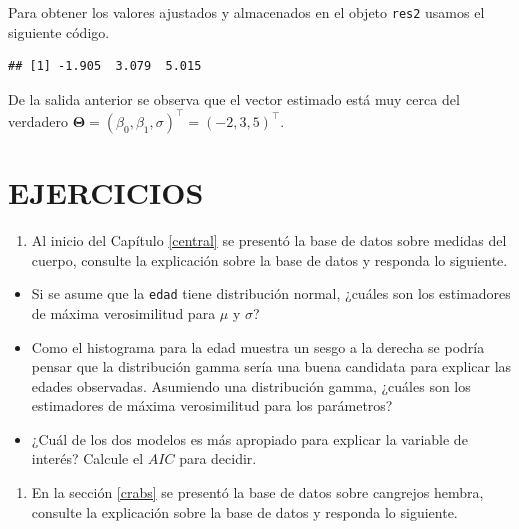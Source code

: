 \documentclass[10pt,]{krantz}
\makeatletter
\newenvironment{Shaded}{\begin{snugshade}}{\end{snugshade}}
\newcommand{\KeywordTok}[1]{\textcolor[rgb]{0.13,0.29,0.53}{\textbf{#1}}}
\newcommand{\DecValTok}[1]{\textcolor[rgb]{0.00,0.00,0.81}{#1}}
\newcommand{\OperatorTok}[1]{\textcolor[rgb]{0.81,0.36,0.00}{\textbf{#1}}}
\newcommand{\NormalTok}[1]{#1}
\providecommand{\tightlist}{%
  \setlength{\itemsep}{0pt}\setlength{\parskip}{0pt}}
\newenvironment{kframe}{%
\medskip{}
\setlength{\fboxsep}{.8em}
 \def\at@end@of@kframe{}%
 \ifinner\ifhmode%
  \def\at@end@of@kframe{\end{minipage}}%
  \begin{minipage}{\columnwidth}%
 \fi\fi%
 \def\FrameCommand##1{\hskip\@totalleftmargin \hskip-\fboxsep
 \colorbox{shadecolor}{##1}\hskip-\fboxsep
     \hskip-\linewidth \hskip-\@totalleftmargin \hskip\columnwidth}%
 \MakeFramed {\advance\hsize-\width
   \@totalleftmargin\z@ \linewidth\hsize
   \@setminipage}}%
 {\par\unskip\endMakeFramed%
 \at@end@of@kframe}
\renewenvironment{Shaded}{\begin{kframe}}{\end{kframe}}
\makeatother
\begin{document}
Para obtener los valores ajustados y almacenados en el objeto
\texttt{res2} usamos el siguiente código.

\begin{Shaded}
\end{Shaded}

\begin{verbatim}
## [1] -1.905  3.079  5.015
\end{verbatim}

De la salida anterior se observa que el vector estimado está muy cerca
del verdadero
\(\boldsymbol{\Theta}=(\beta_0, \beta_1, \sigma)^\top=(-2, 3, 5)^\top\).

\section*{EJERCICIOS}\label{ejercicios-6}


\begin{enumerate}
\def\labelenumi{\arabic{enumi})}
\tightlist
\item
  Al inicio del Capítulo \ref{central} se presentó la base de datos
  sobre medidas del cuerpo, consulte la explicación sobre la base de
  datos y responda lo siguiente.
\end{enumerate}

\begin{itemize}
\tightlist
\item
  Si se asume que la \texttt{edad} tiene distribución normal, ¿cuáles
  son los estimadores de máxima verosimilitud para \(\mu\) y \(\sigma\)?
\item
  Como el histograma para la edad muestra un sesgo a la derecha se
  podría pensar que la distribución gamma sería una buena candidata para
  explicar las edades observadas. Asumiendo una distribución gamma,
  ¿cuáles son los estimadores de máxima verosimilitud para los
  parámetros?
\item
  ¿Cuál de los dos modelos es más apropiado para explicar la variable de
  interés? Calcule el \(AIC\) para decidir.
\end{itemize}

\begin{enumerate}
\def\labelenumi{\arabic{enumi})}
\setcounter{enumi}{1}
\tightlist
\item
  En la sección \ref{crabs} se presentó la base de datos sobre cangrejos
  hembra, consulte la explicación sobre la base de datos y responda lo
  siguiente.
\end{enumerate}
\end{document}
